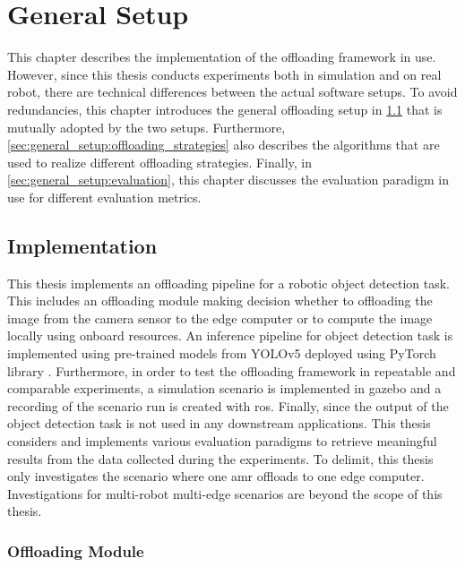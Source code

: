 \chapter{General Setup}\label{ch:general_setup}

This chapter describes the implementation of the offloading framework in use. However, since this thesis conducts experiments both in simulation and on real robot, there are technical differences between the actual software setups. To avoid redundancies, this chapter introduces the general offloading setup in \cref{sec:general_setup:implementation} that is mutually adopted by the two setups. Furthermore, \cref{sec:general_setup:offloading_strategies} also describes the algorithms that are used to realize different offloading strategies. 
Finally, in \cref{sec:general_setup:evaluation}, this chapter discusses the evaluation paradigm in use for different evaluation metrics.

\section{Implementation}\label{sec:general_setup:implementation}

This thesis implements an offloading pipeline for a robotic object detection task. This includes an offloading module making decision whether to offloading the image from the camera sensor to the edge computer or to compute the image locally using onboard resources. An inference pipeline for object detection task is implemented using pre-trained models from YOLOv5 \cite{Jocher2020} deployed using PyTorch library \cite{Paszke2019}. Furthermore, in order to test the offloading framework in repeatable and comparable experiments, a simulation scenario is implemented in \gls{gazebo} \cite{Koenig2004} and a recording of the scenario run is created with \gls{ros}. Finally, since the output of the object detection task is not used in any downstream applications. This thesis considers and implements various evaluation paradigms to retrieve meaningful results from the data collected during the experiments. To delimit, this thesis only investigates the scenario where one \gls{amr} offloads to one edge computer. Investigations for multi-robot multi-edge scenarios are beyond the scope of this thesis. 

\subsection{Offloading Module}

